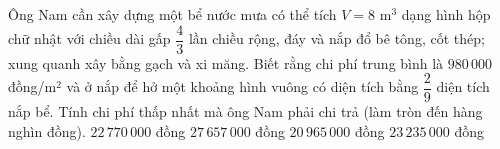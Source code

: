 \begin{ex}%
	Ông Nam cần xây dựng một bể nước mưa có thể tích $V = 8$ m$^3$ dạng hình hộp chữ nhật với chiều dài gấp $\dfrac{4}{3}$ lần chiều rộng, đáy và nắp đổ bê tông, cốt thép; xung quanh xây bằng gạch và xi măng. Biết rằng chi phí trung bình là $980\,000$ đồng/m$^2$ và ở nắp để hở một khoảng hình vuông có diện tích bằng $\dfrac{2}{9}$  diện tích nắp bể. Tính chi phí thấp nhất mà ông Nam phải chi trả (làm tròn đến hàng nghìn đồng).
	\choice 
		{$22\,770\,000$ đồng} 
		{\True $27\,657\,000$  đồng}
		{$20\,965\,000$  đồng}
		{$23\,235\,000$  đồng}
\end{ex}

